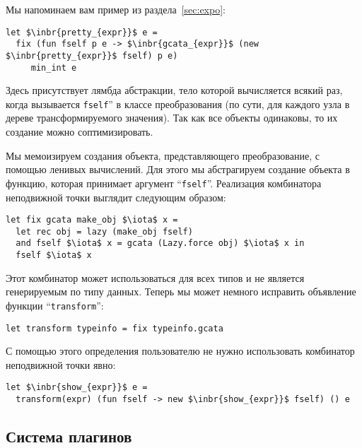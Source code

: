 Мы напоминаем вам пример из раздела~\ref{sec:expo}:

\begin{lstlisting}
let $\inbr{pretty_{expr}}$ e =
  fix (fun fself p e -> $\inbr{gcata_{expr}}$ (new $\inbr{pretty_{expr}}$ fself) p e)     
     min_int e
\end{lstlisting}

Здесь присутствует лямбда абстракции, тело которой вычисляется всякий раз, когда вызывается \lstinline{fself}'' в классе преобразования (по сути, для каждого узла в дереве трансформируемого значения). Так как все объекты одинаковы, то их создание можно соптимизировать.

Мы мемоизируем создания объекта, представляющего преобразование, с помощью ленивых вычислений. Для этого мы абстрагируем создание объекта в функцию, которая принимает
аргумент ``\lstinline{fself}''. Реализация комбинатора неподвижной точки выглядит следующим образом:

\begin{lstlisting}
let fix gcata make_obj $\iota$ x =
  let rec obj = lazy (make_obj fself)
  and fself $\iota$ x = gcata (Lazy.force obj) $\iota$ x in
  fself $\iota$ x
\end{lstlisting}

Этот комбинатор может использоваться для всех типов и не является генерируемым по типу данных. Теперь мы может немного исправить объявление функции ``\lstinline{transform}'':

\begin{lstlisting}
let transform typeinfo = fix typeinfo.gcata
\end{lstlisting}

С помощью этого определения пользователю не нужно использовать комбинатор неподвижной точки явно:

\begin{lstlisting}
let $\inbr{show_{expr}}$ e =
  transform(expr) (fun fself -> new $\inbr{show_{expr}}$ fself) () e
\end{lstlisting}

\subsection{Система плагинов}
\label{plugins}

